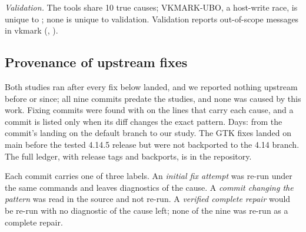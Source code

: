 \emph{Validation.} The tools share 10 true causes; VKMARK-UBO, a host-write race, is unique to \sys; none is unique to
validation. Validation reports out-of-scope messages in vkmark (,
).

\subsection{Provenance of upstream fixes}
\label{sup:ledger}
Both studies ran after every fix below landed, and we reported nothing upstream before or since; all nine commits
predate the studies, and none was caused by this work. Fixing commits were found with  on the lines
that carry each cause, and a commit is listed only when its diff changes the exact pattern. Days: from the commit's
landing on the default branch to our study. The GTK fixes landed on main before the tested 4.14.5 release but were not
backported to the 4.14 branch. The full ledger, with release tags and backports, is  in the repository.

Each commit carries one of three labels. An \emph{initial fix attempt} was re-run under the same commands and leaves
diagnostics of the cause. A \emph{commit changing the pattern} was read in the source and not re-run. A \emph{verified
complete repair} would be re-run with no diagnostic of the cause left; none of the nine was re-run as a complete
repair.

